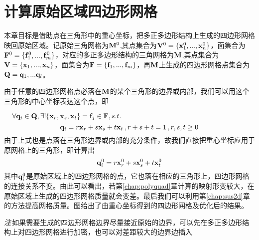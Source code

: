 \chapter{计算原始区域四边形网格}

本章目标是借助点在三角形中的重心坐标，把多正多边形结构上生成的四边形网格映回原始区域。记原始三角网格为$\mathbf{M}^0$,其点集合为$\mathbf{V}^0=\{\mathbf{x}_1^0,...,\mathbf{x}_n^0\}$，面集合为$\mathbf{F}^0=\{\mathbf{f}_1^0,...,\mathbf{f}_m^0\}$，对应的多正多边形结构的三角网格为$\mathbf{M} $,其点集合为$\mathbf{V}=\{\mathbf{x}_1,...,\mathbf{x}_n\}$，面集合为$\mathbf{F}=\{\mathbf{f}_1,...,\mathbf{f}_m\}$，再$\mathbf{M}$上生成的四边形网格点集合为$\mathbf{Q}={\mathbf{q}_1,...\mathbf{q}_l}$。

由于任意的四边形网格点必落在$\mathbf{M}$的某个三角形的边界或内部，我们可以用这个三角形的中心坐标表达这个点，即

$\,\,\,\,\,\,\,\forall \mathbf{q}_i \in \mathbf{Q}, \exists ! \{\mathbf{x}_r,\mathbf{x}_s,\mathbf{x}_t\}=\mathbf{f}_j \in \mathbf{F}, s.t.$
\begin{equation}\label{equ:meancoor}
\mathbf{q}_i=r\mathbf{x}_r+s\mathbf{x}_s+t\mathbf{x}_t\,,r+s+t=1\,,r,s,t\geq 0
\end{equation}
由于上式也是点落在三角形边界或内部的充分条件，故我们直接把重心坐标应用于原网格上的三角形，即计算出
\begin{equation} \label{equ:quadvertex}
\mathbf{q}_i^0=r\mathbf{x}_r^0+s\mathbf{x}_s^0+t\mathbf{x}_t^0
\end{equation}
其中$\mathbf{q}_i^0$是原始区域上的四边形网格的点，它也落在相应的三角形上，四边形网格的连接关系不变。由此可以看出，若第\ref{chap:polyquad}章计算的映射形变较大，在原始区域上生成的四边形网格质量就会变差。最后我们可以利用第\ref{chap:sus2d}章的方法提高网格质量。图给出了由重心坐标得到的四边形网格及优化后的结果。

\emph{注}\,如果需要生成的四边形网格边界尽量接近原始的边界，可以先在多正多边形结构上对四边形网格进行加密，也可以对差距较大的边界边插入
